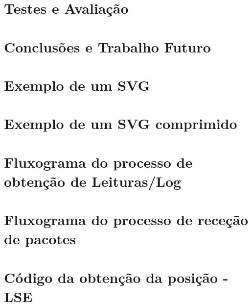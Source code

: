 \documentclass[a4paper, twoside, 12pt]{report}
\makeatletter
\renewcommand*{\cleardoublepage}{\clearpage\if@twoside \ifodd\c@page\else
\hbox{}%
\thispagestyle{empty}%
\newpage%
\if@twocolumn\hbox{}\newpage\fi\fi\fi}
\makeatother
\begin{document}
\chapter{Testes e Avaliação}


\chapter{Conclusões e Trabalho Futuro}








\renewcommand{\thesection}{Apêndices \Roman{section}}

\begin{appendices}
\chapter{Exemplo de um SVG} \label{svg}

 \chapter{Exemplo de um SVG comprimido} \label{svggo}

\chapter{Fluxograma do processo de obtenção de Leituras/Log}\label{E}


 \chapter{Fluxograma do processo de receção de pacotes} \label{flux1}

\chapter{Código da obtenção da posição - LSE}\label{D}



\end{appendices}
\end{document}
